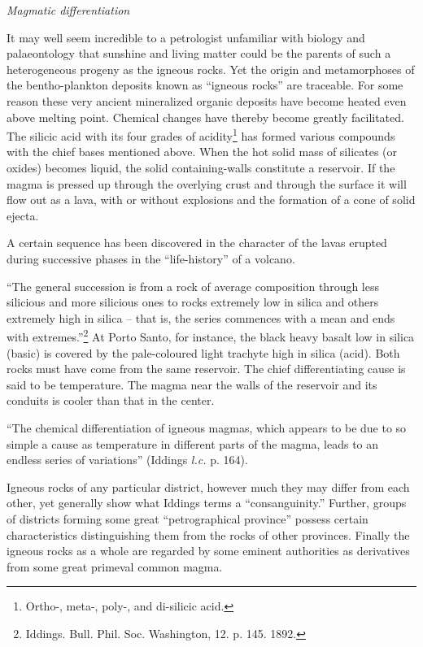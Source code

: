 \documentclass[a4paper, 12pt, oneside]{article}
\begin{document}
\emph{Magmatic differentiation}

It may well seem incredible to a petrologist unfamiliar with biology and palaeontology that sunshine and living matter could be the parents of such a heterogeneous progeny as the igneous rocks. Yet the origin and metamorphoses of the bentho-plankton deposits known as ``igneous rocks'' are traceable. For some reason these very ancient mineralized organic deposits have become heated even above melting point. Chemical changes have thereby become greatly facilitated. The silicic acid with its four grades of acidity\footnote{Ortho-, meta-, poly-, and di-silicic acid.} has formed various compounds with the chief bases mentioned above. When the hot solid mass of silicates (or oxides) becomes liquid, the solid containing-walls constitute a reservoir. If the magma is pressed up through the overlying crust and through the surface it will flow out as a lava, with or without explosions and the formation of a cone of solid ejecta.

A certain sequence has been discovered in the character of the lavas erupted during successive phases in the ``life-history'' of a volcano.

``The general succession is from a rock of average composition through less silicious and more silicious ones to rocks extremely low in silica and others extremely high in silica -- that is, the series commences with a mean and ends with extremes.''\footnote{Iddings. Bull. Phil. Soc. Washington, 12. p. 145. 1892.} At Porto Santo, for instance, the black heavy basalt low in silica (basic) is covered by the pale-coloured light trachyte high in silica (acid). Both rocks must have come from the same reservoir. The chief differentiating cause is said to be temperature. The magma near the walls of the reservoir and its conduits is cooler than that in the center.

``The chemical differentiation of igneous magmas, which appears to be due to so simple a cause as temperature in different parts of the magma, leads to an endless series of variations'' (Iddings \emph{l.c.} p. 164).

Igneous rocks of any particular district, however much they may differ from each other, yet generally show what Iddings terms a ``consanguinity.'' Further, groups of districts forming some great ``petrographical province'' possess certain characteristics distinguishing them from the rocks of other provinces. Finally the igneous rocks as a whole are regarded by some eminent authorities as derivatives from some great primeval common magma.
\end{document}
